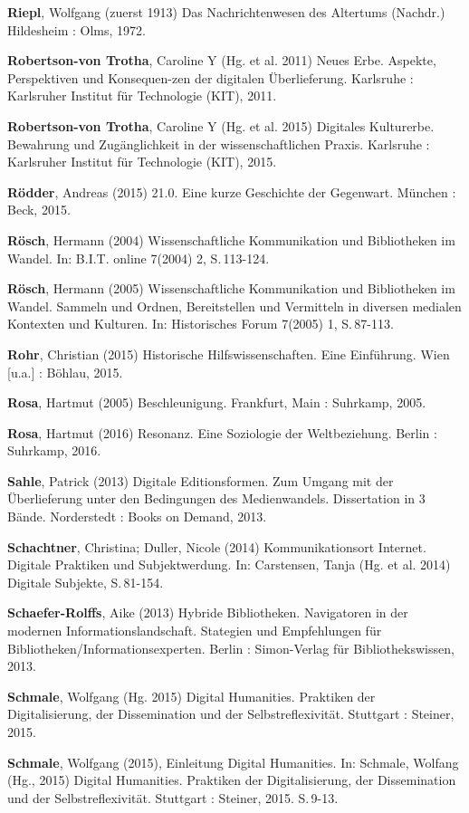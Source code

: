 \documentclass[a4paper,
fontsize=11pt,
oneside,
numbers=noperiodatend,
parskip=half-,
bibliography=totoc,
final
]{scrartcl}
\begin{document}
\textbf{Riepl}, Wolfgang (zuerst 1913) Das Nachrichtenwesen des
Altertums (Nachdr.) Hildesheim : Olms, 1972.

\textbf{Robertson-von Trotha}, Caroline Y (Hg. et al. 2011) Neues Erbe.
Aspekte, Perspektiven und Konsequen-zen der digitalen Überlieferung.
Karlsruhe : Karlsruher Institut für Technologie (KIT), 2011.

\textbf{Robertson-von Trotha}, Caroline Y (Hg. et al. 2015) Digitales
Kulturerbe. Bewahrung und Zugänglichkeit in der wissenschaftlichen
Praxis. Karlsruhe : Karlsruher Institut für Technologie (KIT), 2015.

\textbf{Rödder}, Andreas (2015) 21.0. Eine kurze Geschichte der
Gegenwart. München : Beck, 2015.

\textbf{Rösch}, Hermann (2004) Wissenschaftliche Kommunikation und
Bibliotheken im Wandel. In: B.I.T. online 7(2004) 2, S.\,113-124.

\textbf{Rösch}, Hermann (2005) Wissenschaftliche Kommunikation und
Bibliotheken im Wandel. Sammeln und Ordnen, Bereitstellen und Vermitteln
in diversen medialen Kontexten und Kulturen. In: Historisches Forum
7(2005) 1, S.\,87-113.

\textbf{Rohr}, Christian (2015) Historische Hilfswissenschaften. Eine
Einführung. Wien {[}u.a.{]} : Böhlau, 2015.

\textbf{Rosa}, Hartmut (2005) Beschleunigung. Frankfurt, Main :
Suhrkamp, 2005.

\textbf{Rosa}, Hartmut (2016) Resonanz. Eine Soziologie der
Weltbeziehung. Berlin : Suhrkamp, 2016.

\textbf{Sahle}, Patrick (2013) Digitale Editionsformen. Zum Umgang mit
der Überlieferung unter den Bedingungen des Medienwandels. Dissertation
in 3 Bände. Norderstedt : Books on Demand, 2013.

\textbf{Schachtner}, Christina; Duller, Nicole (2014) Kommunikationsort
Internet. Digitale Praktiken und Subjektwerdung. In: Carstensen, Tanja
(Hg. et al. 2014) Digitale Subjekte, S.\,81-154.

\textbf{Schaefer-Rolffs}, Aike (2013) Hybride Bibliotheken. Navigatoren
in der modernen Informationslandschaft. Stategien und Empfehlungen für
Bibliotheken/Informationsexperten. Berlin : Simon-Verlag für
Bibliothekswissen, 2013.

\textbf{Schmale}, Wolfgang (Hg. 2015) Digital Humanities. Praktiken der
Digitalisierung, der Dissemination und der Selbstreflexivität. Stuttgart
: Steiner, 2015.

\textbf{Schmale}, Wolfgang (2015), Einleitung Digital Humanities. In:
Schmale, Wolfang (Hg., 2015) Digital Humanities. Praktiken der
Digitalisierung, der Dissemination und der Selbstreflexivität. Stuttgart
: Steiner, 2015. S.\,9-13.
\end{document}
